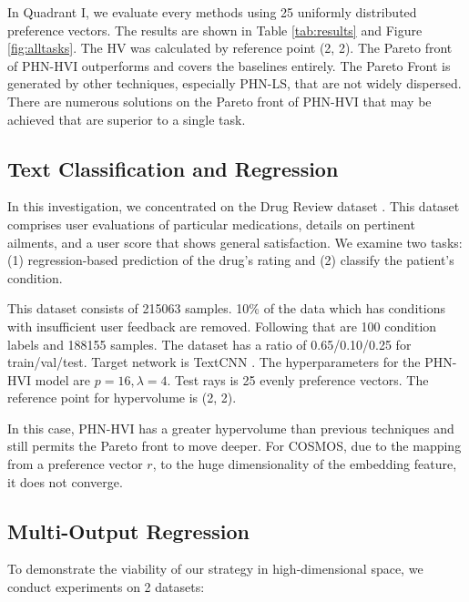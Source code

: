 \documentclass[letterpaper]{article} %
\newcommand{\ourmodel}{PHN-HVI }
\begin{document}
In Quadrant I, we evaluate every methods using 25 uniformly distributed preference vectors. The results are shown in Table \ref{tab:results} and Figure \ref{fig:alltasks}. The HV was calculated by reference point (2, 2). The Pareto front of \ourmodel outperforms and covers the baselines entirely. The Pareto Front is generated by other techniques, especially PHN-LS, that are not widely dispersed. There are numerous solutions on the Pareto front of \ourmodel that may be achieved that are superior to a single task.

\subsection{Text Classification and Regression}


In this investigation, we concentrated on the Drug Review dataset \cite{Felix2018}. This dataset comprises user evaluations of particular medications, details on pertinent ailments, and a user score that shows general satisfaction. We examine two tasks: (1) regression-based prediction of the drug's rating and (2) classify the patient's condition.

This dataset consists of 215063 samples. 10\% of the data which has conditions with insufficient user feedback are removed.
Following that are 100 condition labels and 188155 samples. The dataset has a ratio of 0.65/0.10/0.25 for train/val/test. Target network is TextCNN \cite{TextCNN}. The hyperparameters for the \ourmodel model are $p=16, \lambda=4$. Test rays is 25 evenly preference vectors. The reference point for hypervolume is (2, 2).

In this case, \ourmodel has a greater hypervolume than previous techniques and still permits the Pareto front to move deeper. For COSMOS, due to the mapping from a preference vector $r$, to the huge dimensionality of the embedding feature, it does not converge.

\subsection{Multi-Output Regression}
To demonstrate the viability of our strategy in high-dimensional space, we conduct experiments on 2 datasets:
\end{document}
